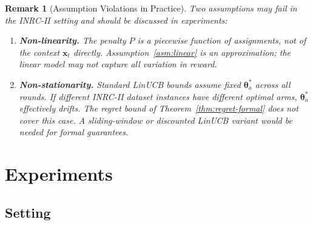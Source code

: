 \documentclass[11pt]{article}
\newtheorem{remark}{Remark}
\begin{document}
\begin{remark}[Assumption Violations in Practice]
  Two assumptions may fail in the INRC-II setting and should be discussed
  in experiments:
  \begin{enumerate}
    \item \textbf{Non-linearity.} The penalty $P$ is a piecewise function
    of assignments, not of the context $\mathbf{x}_t$ directly.
    Assumption~\ref{asm:linear} is an approximation; the linear model
    may not capture all variation in reward.
    \item \textbf{Non-stationarity.} Standard LinUCB bounds assume fixed
    $\boldsymbol{\theta}_a^*$ across all rounds. If different INRC-II
    dataset instances have different optimal arms, $\boldsymbol{\theta}_a^*$
    effectively drifts. The regret bound of Theorem~\ref{thm:regret-formal}
    does not cover this case. A sliding-window or discounted LinUCB variant
    would be needed for formal guarantees.
  \end{enumerate}
\end{remark}

\section{Experiments}

\subsection{Setting}
\end{document}
